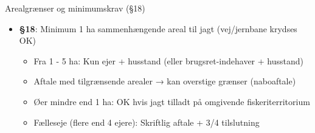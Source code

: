 \begin{frame}{Arealgrænser og minimumskrav (§18)}
    \begin{itemize}
        \item \textbf{§18}: Minimum 1 ha sammenhængende areal til jagt (vej/jernbane krydses OK)
          \begin{itemize}
            \item Fra 1 - 5 ha: Kun ejer + husstand (eller brugsret-indehaver + husstand)
            \item Aftale med tilgrænsende arealer → kan overstige grænser (naboaftale)
            \item Øer mindre end 1 ha: OK hvis jagt tilladt på omgivende fiskeriterritorium
            \item Fælleseje (flere end 4 ejere): Skriftlig aftale + 3/4 tilslutning
          \end{itemize}
    \end{itemize}
\end{frame}